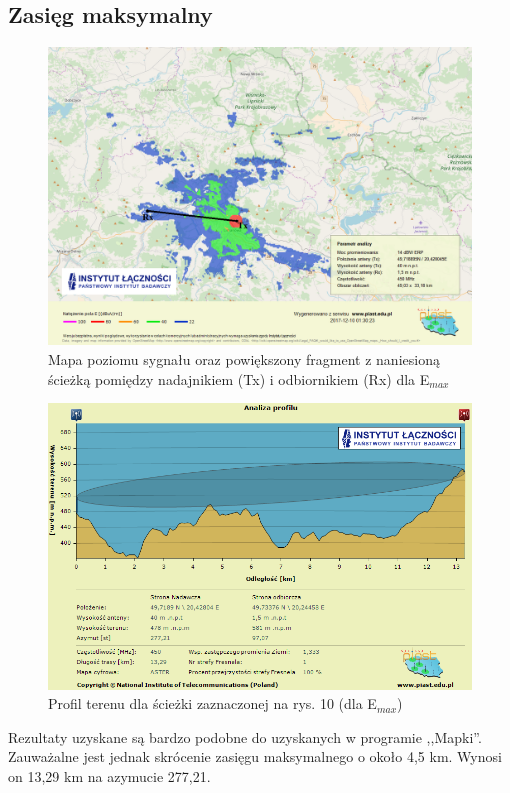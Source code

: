 \documentclass[12pt, a4paper, oneside]{article}
\begin{document}
\subsection{Zasięg maksymalny}
\begin{figure}[h!]
\centering
\includegraphics[scale=0.45]{pics/piast/f5.png}
\caption{Mapa poziomu sygnału oraz powiększony fragment z naniesioną ścieżką pomiędzy nadajnikiem (Tx) i odbiornikiem (Rx) dla E$_{max}$}
\end{figure}
\begin{figure}[h!]
\centering
\includegraphics[scale=0.45]{pics/piast/f3.png}
\caption{Profil terenu dla ścieżki zaznaczonej na rys. 10 (dla E$_{max}$)}
\end{figure}
Rezultaty uzyskane są bardzo podobne do uzyskanych w programie ,,Mapki''. Zauważalne jest jednak skrócenie zasięgu maksymalnego o około 4,5 km. Wynosi on 13,29 km na azymucie 277,21\textdegree.
\clearpage
\end{document}
